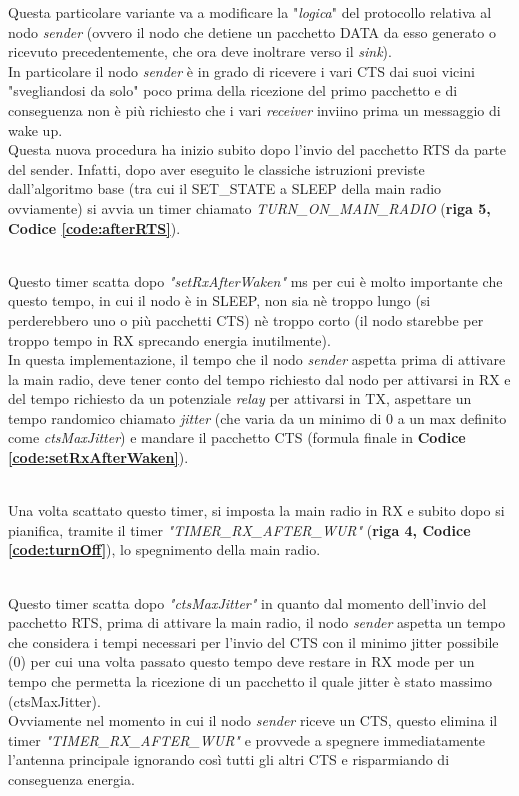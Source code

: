 Questa particolare variante va a modificare la "\textit{logica}" del protocollo relativa al nodo \textit{sender} (ovvero il nodo che detiene un pacchetto DATA da esso generato o ricevuto precedentemente, che ora deve inoltrare verso il \textit{sink}). \\
In particolare il nodo \textit{sender} è in grado di ricevere i vari CTS dai suoi vicini "svegliandosi da solo" poco prima della ricezione del primo pacchetto e di conseguenza non è più richiesto che i vari \textit{receiver} inviino prima un messaggio di wake up. \\

Questa nuova procedura ha inizio subito dopo l'invio del pacchetto RTS da parte del sender. Infatti, dopo aver eseguito le classiche istruzioni previste dall'algoritmo base (tra cui il SET\_STATE a SLEEP della main radio ovviamente) si avvia un timer chiamato \textit{TURN\_ON\_MAIN\_RADIO} (\textbf{riga 5, Codice \ref{code:afterRTS}}).

 \\

Questo timer scatta dopo \textit{"setRxAfterWaken"} ms per cui è molto importante che questo tempo, in cui il nodo è in SLEEP, non sia nè troppo lungo (si perderebbero uno o più pacchetti CTS) nè troppo corto (il nodo starebbe per troppo tempo in RX sprecando energia inutilmente). \\
In questa implementazione, il tempo che il nodo \textit{sender} aspetta prima di attivare la main radio, deve tener conto del tempo richiesto dal nodo per attivarsi in RX e del tempo richiesto da un potenziale \textit{relay} per attivarsi in TX, aspettare un tempo randomico chiamato \textit{jitter} (che varia da un minimo di 0 a un max definito come \textit{ctsMaxJitter}) e mandare il pacchetto CTS (formula finale in \textbf{Codice \ref{code:setRxAfterWaken}}).

 \\

Una volta scattato questo timer, si imposta la main radio in RX e subito dopo si pianifica, tramite il timer \textit{"TIMER\_RX\_AFTER\_WUR"} (\textbf{riga 4, Codice \ref{code:turnOff}}), lo spegnimento della main radio.

 \\

Questo timer scatta dopo \textit{"ctsMaxJitter"} in quanto dal momento dell'invio del pacchetto RTS, prima di attivare la main radio, il nodo \textit{sender} aspetta un tempo che considera i tempi necessari per l'invio del CTS con il minimo jitter possibile (0) per cui una volta passato questo tempo deve restare in RX mode per un tempo che permetta la ricezione di un pacchetto il quale jitter è stato massimo (ctsMaxJitter). \\

Ovviamente nel momento in cui il nodo \textit{sender} riceve un CTS, questo elimina il timer \textit{"TIMER\_RX\_AFTER\_WUR"} e provvede a spegnere immediatamente l'antenna principale ignorando così tutti gli altri CTS e risparmiando di conseguenza energia. 